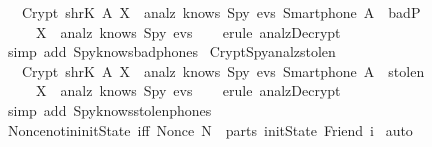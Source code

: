 \begin{isabellebody}
  \ \ {\isachardoublequoteopen}{\isasymlbrakk}\ Crypt\ {\isacharparenleft}shrK\ A{\isacharparenright}\ X\ {\isasymin}\ analz\ {\isacharparenleft}knows\ Spy\ evs{\isacharparenright}{\isacharsemicolon}\ Smartphone\ A\ {\isasymin}\ badP\ {\isasymrbrakk}\ \isanewline
  \ \ \ \ {\isasymLongrightarrow}\ X\ {\isasymin}\ analz\ {\isacharparenleft}knows\ Spy\ evs{\isacharparenright}{\isachardoublequoteclose}\isanewline
  \isadelimproof
  \isanewline
  \ \ %
  \endisadelimproof
  \isatagproof
  \isamarkupfalse%
  \ {\isacharparenleft}erule\ analz{\isachardot}Decrypt{\isacharparenright}\isanewline
  \ \ \isamarkupfalse%
  \ {\isacharparenleft}simp\ add{\isacharcolon}\ Spy{\isacharunderscore}knows{\isacharunderscore}bad{\isacharunderscore}phones{\isacharparenright}\isanewline
  \isamarkupfalse%
  \endisatagproof
  {\isafoldproof}%
  \isadelimproof
  \isanewline
  \endisadelimproof
  \isanewline
  \isamarkupfalse%
  \ Crypt{\isacharunderscore}Spy{\isacharunderscore}analz{\isacharunderscore}stolen\ {\isacharcolon}\ \isanewline
  \ \ {\isachardoublequoteopen}{\isasymlbrakk}\ Crypt\ {\isacharparenleft}shrK\ A{\isacharparenright}\ X\ {\isasymin}\ analz\ {\isacharparenleft}knows\ Spy\ evs{\isacharparenright}{\isacharsemicolon}\ Smartphone\ A\ {\isasymin}\ stolen\ {\isasymrbrakk}\ \isanewline
  \ \ \ \ {\isasymLongrightarrow}\ X\ {\isasymin}\ analz\ {\isacharparenleft}knows\ Spy\ evs{\isacharparenright}{\isachardoublequoteclose}\isanewline
  \isadelimproof
  \isanewline
  \ \ %
  \endisadelimproof
  \isatagproof
  \isamarkupfalse%
  \ {\isacharparenleft}erule\ analz{\isachardot}Decrypt{\isacharparenright}\isanewline
  \ \ \isamarkupfalse%
  \ {\isacharparenleft}simp\ add{\isacharcolon}\ Spy{\isacharunderscore}knows{\isacharunderscore}stolen{\isacharunderscore}phones{\isacharparenright}\isanewline
  \isamarkupfalse%
  \endisatagproof
  {\isafoldproof}%
  \isadelimproof
  \isanewline
  \endisadelimproof
  \isanewline
  \isanewline
  \isanewline
  \isamarkupfalse%
  \ Nonce{\isacharunderscore}notin{\isacharunderscore}initState\ {\isacharbrackleft}iff{\isacharbrackright}{\isacharcolon}\ {\isachardoublequoteopen}Nonce\ N\ {\isasymnotin}\ parts\ {\isacharparenleft}initState\ {\isacharparenleft}Friend\ i{\isacharparenright}{\isacharparenright}{\isachardoublequoteclose}\isanewline
  \isadelimproof
  \endisadelimproof
  \isatagproof
  \isamarkupfalse%
  \ auto%
  \endisatagproof

\end{isabellebody}
